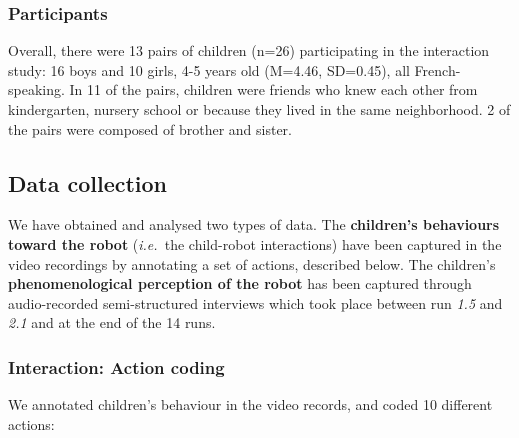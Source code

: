 \documentclass{sig-alternate}
\newcommand{\ie}{{\textit{i.e.~}}}
\begin{document}
\subsubsection{Participants}

Overall, there were 13 pairs of children (n=26) participating in the interaction
study: 16 boys and 10 girls, 4-5 years old (M=4.46, SD=0.45), all
French-speaking. In 11 of the pairs, children were friends who knew each other
from kindergarten, nursery school or because they lived in the same
neighborhood. 2 of the pairs were composed of brother and sister.



\subsection{Data collection}


We have obtained and analysed two types of data. The \textbf{children's
behaviours toward the robot} (\ie the child-robot interactions) have been
captured in the video recordings by annotating a set of actions, described
below. The children's \textbf{phenomenological perception of the robot} has been
captured through audio-recorded semi-structured interviews which took place
between run \emph{1.5} and \emph{2.1} and at the end of the 14 runs.


\subsubsection{Interaction: Action coding}

We annotated children's behaviour in the video records, and coded 10 different
actions:
\end{document}
